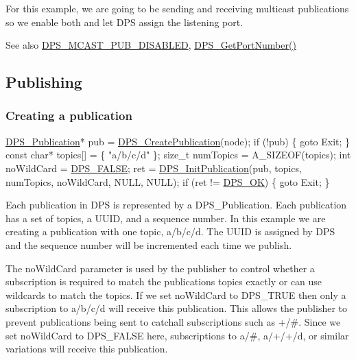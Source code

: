 For this example, we are going to be sending and receiving multicast publications so we enable both and let D\+PS assign the listening port.

\begin{DoxySeeAlso}{See also}
\hyperlink{group__node_gac939c83361ed89086f37c78d9c9009dd}{D\+P\+S\+\_\+\+M\+C\+A\+S\+T\+\_\+\+P\+U\+B\+\_\+\+D\+I\+S\+A\+B\+L\+ED}, \hyperlink{group__node_gaf920b28fe0721a7f97b11673494d7b36}{D\+P\+S\+\_\+\+Get\+Port\+Number()}
\end{DoxySeeAlso}
\hypertarget{tutorials-hello-world_publishing}{}\subsection{Publishing}\label{tutorials-hello-world_publishing}
\hypertarget{tutorials-hello-world_creating-a-publication}{}\subsubsection{Creating a publication}\label{tutorials-hello-world_creating-a-publication}

\begin{DoxyCodeInclude}
    \hyperlink{group__publication_ga0d439693474aa54e27f3d45a054696ac}{DPS\_Publication}* pub = \hyperlink{group__publication_gaca070a96a6374e99a05d647c10737962}{DPS\_CreatePublication}(node);
    \textcolor{keywordflow}{if} (!pub) \{
        \textcolor{keywordflow}{goto} Exit;
    \}
    \textcolor{keyword}{const} \textcolor{keywordtype}{char}* topics[] = \{
        \textcolor{stringliteral}{"a/b/c/d"}
    \};
    \textcolor{keywordtype}{size\_t} numTopics = A\_SIZEOF(topics);
    \textcolor{keywordtype}{int} noWildCard = \hyperlink{dps_8h_ad8b397975a479b996ef223367d8835a9}{DPS\_FALSE};
    ret = \hyperlink{group__publication_ga7b0709e28cb34d5a30b90e4142cd6c19}{DPS\_InitPublication}(pub, topics, numTopics, noWildCard, NULL, NULL);
    \textcolor{keywordflow}{if} (ret != \hyperlink{group__status_ga0ea3dd37bc558859ae0cb5a4f79a4bdd}{DPS\_OK}) \{
        \textcolor{keywordflow}{goto} Exit;
    \}
\end{DoxyCodeInclude}
 Each publication in D\+PS is represented by a {\ttfamily D\+P\+S\+\_\+\+Publication}. Each publication has a set of topics, a U\+U\+ID, and a sequence number. In this example we are creating a publication with one topic, {\ttfamily a/b/c/d}. The U\+U\+ID is assigned by D\+PS and the sequence number will be incremented each time we publish.

The {\ttfamily no\+Wild\+Card} parameter is used by the publisher to control whether a subscription is required to match the publication\textquotesingle{}s topics exactly or can use wildcards to match the topics. If we set {\ttfamily no\+Wild\+Card} to {\ttfamily D\+P\+S\+\_\+\+T\+R\+UE} then only a subscription to {\ttfamily a/b/c/d} will receive this publication. This allows the publisher to prevent publications being sent to catchall subscriptions such as {\ttfamily +/\#}. Since we set {\ttfamily no\+Wild\+Card} to {\ttfamily D\+P\+S\+\_\+\+F\+A\+L\+SE} here, subscriptions to {\ttfamily a/\#}, {\ttfamily a/+/+/d}, or similar variations will receive this publication.

